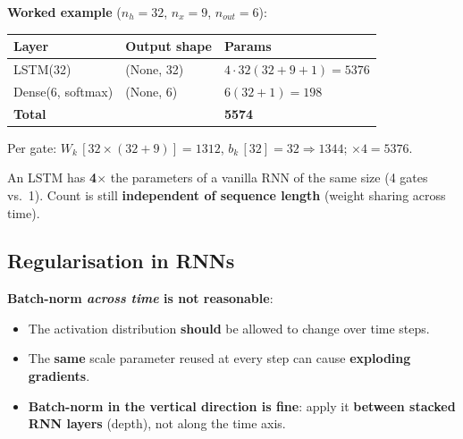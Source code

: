 \documentclass[10pt,a4paper]{article}
\begin{document}
	\textbf{Worked example} ($n_h=32$, $n_x=9$, $n_{out}=6$):
	\begin{center}
		\begin{tabular}{lll}
			\toprule
			Layer & Output shape & Params \\
			\midrule
			LSTM(32) & (None, 32) & $4\cdot 32(32{+}9{+}1) = 5376$ \\
			Dense(6, softmax) & (None, 6) & $6(32{+}1) = 198$ \\
			\midrule
			\textbf{Total} & & \textbf{5574} \\
			\bottomrule
		\end{tabular}
	\end{center}
	Per gate: $W_k\,[32{\times}(32{+}9)]{=}1312$, $b_k\,[32]{=}32 \Rightarrow 1344$; $\times 4 = 5376$.

	\begin{importantbox}
		An LSTM has \textbf{4$\times$} the parameters of a vanilla RNN of the same size (4 gates vs.\ 1). Count is still \textbf{independent of sequence length} (weight sharing across time).
	\end{importantbox}

	\subsection{Regularisation in RNNs}

	\begin{importantbox}
		\textbf{Batch-norm \emph{across time} is not reasonable}:
		\begin{itemize}[leftmargin=*, nosep]
			\item The activation distribution \textbf{should} be allowed to change over time steps.
			\item The \textbf{same} scale parameter reused at every step can cause \textbf{exploding gradients}.
		\end{itemize}
	\end{importantbox}

	\begin{itemize}[leftmargin=*]
		\item \textbf{Batch-norm in the vertical direction is fine}: apply it \textbf{between stacked RNN layers} (depth), not along the time axis.
	\end{itemize}
\end{document}
